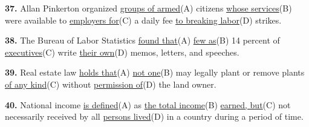 \documentclass[12pt]{article}
\begin{document}
\par
\vspace{\questionblockgap}
\noindent\textbf{37.} Allan Pinkerton organized \uline{groups of armed}(A) citizens \uline{whose services}(B) were available to \uline{employers for}(C) a daily fee \uline{to breaking labor}(D) strikes.
\par
\vspace{\questionblockgap}
\noindent\textbf{38.} The Bureau of Labor Statistics \uline{found that}(A) \uline{few as}(B) 14 percent of \uline{executives}(C) write \uline{their own}(D) memos, letters, and speeches.
\par
\vspace{\questionblockgap}
\noindent\textbf{39.} Real estate law \uline{holds that}(A) \uline{not one}(B) may legally plant or remove plants \uline{of any kind}(C) without \uline{permission of}(D) the land owner.
\par
\vspace{\questionblockgap}
\noindent\textbf{40.} National income \uline{is defined}(A) as \uline{the total income}(B) \uline{earned, but}(C) not necessarily received by all \uline{persons lived}(D) in a country during a period of time.
\par
\vspace{\questionblockgap}
\end{document}
